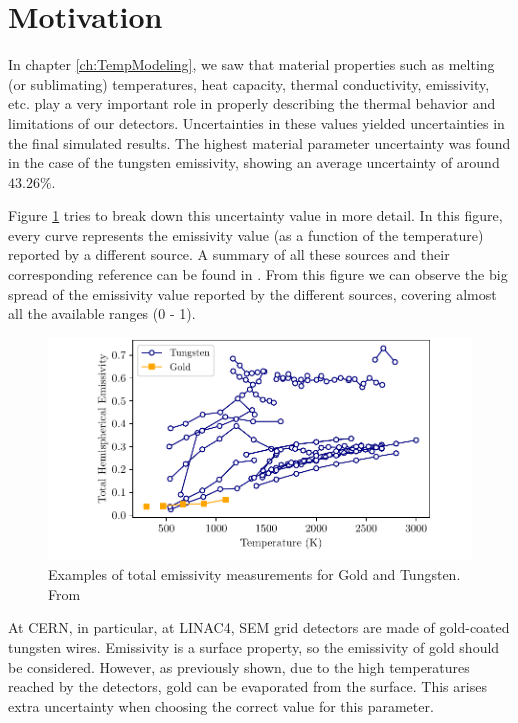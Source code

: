 \pagestyle{fancy}

\graphicspath{ {Figures/Chapter6_EmissivityMeasurement/} }

\section{Motivation}

In chapter \ref{ch:TempModeling}, we saw that material properties such as melting (or sublimating) temperatures, heat capacity, thermal conductivity, emissivity, etc. play a very important role in properly describing the thermal behavior and limitations of our detectors. Uncertainties in these values yielded uncertainties in the final simulated results. The highest material parameter uncertainty was found in the case of the tungsten emissivity, showing an average uncertainty of around $43.26 \%$.

Figure \ref{fig:EmissUnc} tries to break down this uncertainty value in more detail. In this figure, every curve represents the emissivity value (as a function of the temperature) reported by a different source. A summary of all these sources and their corresponding reference can be found in \parencite[]{ref:MatProperties}. From this figure we can observe the big spread of the emissivity value reported by the different sources, covering almost all the available ranges (0 - 1). 

\begin{figure}[h]
    \centering
    \includegraphics[width=1.0\columnwidth]{EmissivityLiteratureVar/EmissivityLit.pdf}
    \caption{Examples of total emissivity measurements for Gold and Tungsten. From \parencite[][]{ref:MatProperties}}
    \label{fig:EmissUnc}
\end{figure}

At CERN, in particular, at LINAC4, SEM grid detectors are made of gold-coated tungsten wires. Emissivity is a surface property, so the emissivity of gold should be considered. However, as previously shown, due to the high temperatures reached by the detectors, gold can be evaporated from the surface. This arises extra uncertainty when choosing the correct value for this parameter. 


